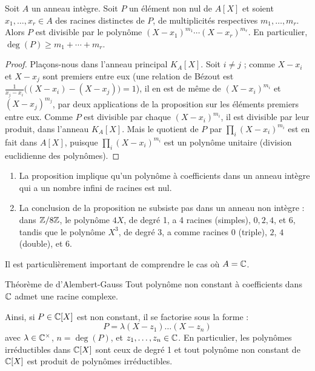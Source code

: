\documentclass[]{report}
\begin{document}
\begin{prop}{}{}
    Soit $A$ un anneau intègre. Soit $P$ un élément non nul de $A[X]$ et soient $x_1, \ldots, x_r \in A$ des racines distinctes de $P$, de multiplicités respectives $m_1, \ldots, m_r$. Alors $P$ est divisible par le polynôme $(X - x_1)^{m_1} \cdots (X - x_r)^{m_r}$. En particulier, $\deg(P) \ge m_1 + \cdots + m_r$.
\end{prop}

\begin{proof}
    Plaçons-nous dans l'anneau principal $K_A[X]$. Soit $i \ne j$ ; comme $X - x_i$ et $X - x_j$ sont premiers entre eux (une relation de Bézout est $\frac{1}{x_j - x_i}\big((X - x_i) - (X - x_j)\big) = 1$), il en est de même de $(X - x_i)^{m_i}$ et $(X - x_j)^{m_j}$, par deux applications de la proposition sur les éléments premiers entre eux. Comme $P$ est divisible par chaque $(X - x_i)^{m_i}$, il est divisible par leur produit, dans l'anneau $K_A[X]$. Mais le quotient de $P$ par $\prod_i (X - x_i)^{m_i}$ est en fait dans $A[X]$, puisque $\prod_i (X - x_i)^{m_i}$ est un polynôme unitaire (division euclidienne des polynômes).
\end{proof}

\begin{re}{}{}
    \begin{enumerate}
        \item La proposition implique qu'un polynôme à coefficients dans un anneau intègre qui a un nombre infini de racines est nul.
        \item La conclusion de la proposition ne subsiste pas dans un anneau non intègre : dans $\mathbb{Z}/8\mathbb{Z}$, le polynôme $4X$, de degré 1, a 4 racines (simples), $0, 2, 4$, et $6$, tandis que le polynôme $X^3$, de degré 3, a comme racines $0$ (triple), $2$, $4$ (double), et $6$.
    \end{enumerate}
\end{re}

Il est particulièrement important de comprendre le cas où $A = \mathbb{C}$.

\begin{tm}{Théorème de d'Alembert-Gauss}{}
    Tout polynôme non constant à coefficients dans $\mathbb{C}$ admet une racine complexe.
\end{tm}

Ainsi, si $P \in \mathbb{C}[X]$ est non constant, il se factorise sous la forme :
\[P = \lambda (X - z_1) \dots (X - z_n)\]
avec $\lambda \in \mathbb{C}^{\times}$, $n = \deg(P)$, et $z_1, \ldots, z_n \in \mathbb{C}$. En particulier, les polynômes irréductibles dans $\mathbb{C}[X]$ sont ceux de degré 1 et tout polynôme non constant de $\mathbb{C}[X]$ est produit de polynômes irréductibles.
\end{document}
